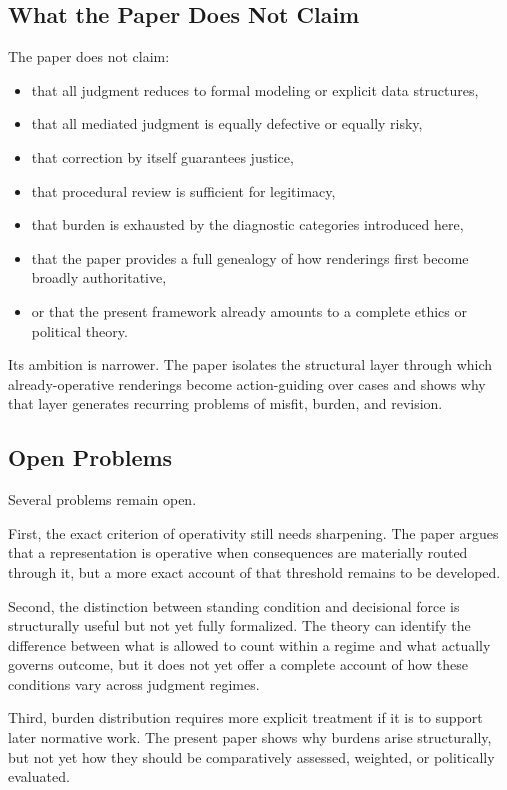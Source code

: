 \documentclass[11pt]{article}
\begin{document}
\subsection{What the Paper Does Not Claim}

The paper does not claim:
\begin{itemize}
    \item that all judgment reduces to formal modeling or explicit data structures,
    \item that all mediated judgment is equally defective or equally risky,
    \item that correction by itself guarantees justice,
    \item that procedural review is sufficient for legitimacy,
    \item that burden is exhausted by the diagnostic categories introduced here,
    \item that the paper provides a full genealogy of how renderings first become broadly authoritative,
    \item or that the present framework already amounts to a complete ethics or political theory.
\end{itemize}

Its ambition is narrower. The paper isolates the structural layer through which already-operative renderings become action-guiding over cases and shows why that layer generates recurring problems of misfit, burden, and revision.

\subsection{Open Problems}

Several problems remain open.

First, the exact criterion of operativity still needs sharpening. The paper argues that a representation is operative when consequences are materially routed through it, but a more exact account of that threshold remains to be developed.

Second, the distinction between standing condition and decisional force is structurally useful but not yet fully formalized. The theory can identify the difference between what is allowed to count within a regime and what actually governs outcome, but it does not yet offer a complete account of how these conditions vary across judgment regimes.

Third, burden distribution requires more explicit treatment if it is to support later normative work. The present paper shows why burdens arise structurally, but not yet how they should be comparatively assessed, weighted, or politically evaluated.
\end{document}
